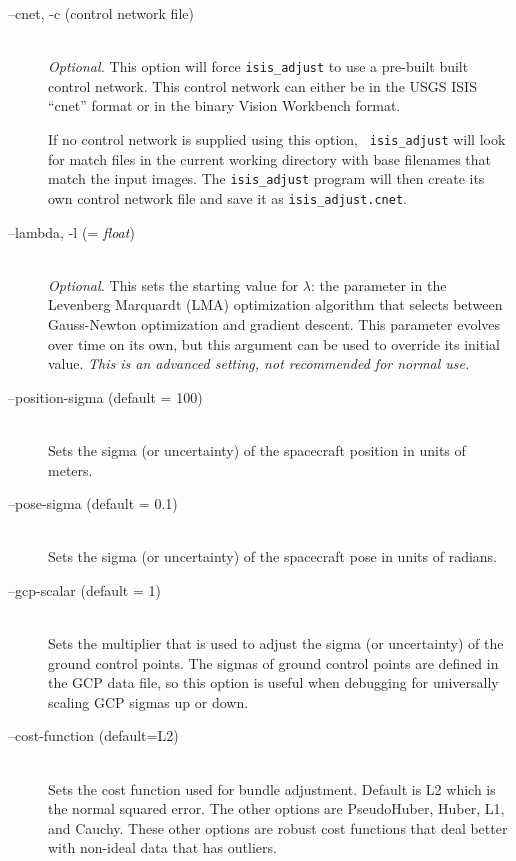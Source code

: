 \begin{description}

\item[--cnet, -c \textnormal{\small{(control network file)}}] \hfill \\
  \emph{Optional.} This option will force {\tt isis\_adjust} to
  use a pre-built built control network. This control network can
  either be in the USGS ISIS ``cnet'' format or in the binary Vision
  Workbench format. 

  If no control network is supplied using this option, {\tt
    isis\_adjust} will look for match files in the current working
  directory with base filenames that match the input images.  The
  \texttt{isis\_adjust} program will then create its own control
  network file and save it as \texttt{isis\_adjust.cnet}.

\item[--lambda, -l \textnormal{\small{(= \emph{float})}}] \hfill \\
  \emph{Optional.} This sets the starting value for $\lambda$: the
  parameter in the Levenberg Marquardt (LMA) optimization algorithm
  that selects between Gauss-Newton optimization and gradient
  descent. This parameter evolves over time on its own, but this
  argument can be used to override its initial value. \emph{This is an
  advanced setting, not recommended for normal use.}

\item[--position-sigma \textnormal{\small{(default = 100)}}] \hfill \\
  Sets the sigma (or uncertainty) of the spacecraft position in
  units of meters.

\item[--pose-sigma \textnormal{\small{(default = 0.1)}}] \hfill \\
  Sets the sigma (or uncertainty) of the spacecraft pose in units
  of radians.

\item[--gcp-scalar \textnormal{\small{(default = 1)}}] \hfill \\
  Sets the multiplier that is used to adjust the sigma
  (or uncertainty) of the ground control points. The sigmas of ground
  control points are defined in the GCP data file, so this
  option is useful when debugging for universally scaling GCP sigmas up
  or down.

\item[--cost-function \textnormal{\small{(default=L2)}}] \hfill \\
  Sets the cost function used for bundle adjustment. Default is L2
  which is the normal squared error. The other options are
  PseudoHuber, Huber, L1, and Cauchy. These other options are robust
  cost functions that deal better with non-ideal data that has
  outliers.


\end{description}
